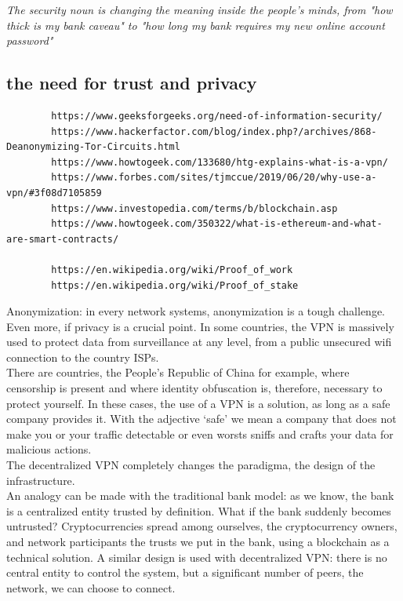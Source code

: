 \documentclass[]{article}
\begin{document}
	\textit{The security noun is changing the meaning inside the people's minds, from "how thick is my bank caveau" to "how long my bank requires my new online account password"}

	\subsection{the need for trust and privacy}

	\begin{verbatim}
		https://www.geeksforgeeks.org/need-of-information-security/
		https://www.hackerfactor.com/blog/index.php?/archives/868-Deanonymizing-Tor-Circuits.html
		https://www.howtogeek.com/133680/htg-explains-what-is-a-vpn/
		https://www.forbes.com/sites/tjmccue/2019/06/20/why-use-a-vpn/#3f08d7105859
		https://www.investopedia.com/terms/b/blockchain.asp
		https://www.howtogeek.com/350322/what-is-ethereum-and-what-are-smart-contracts/
		
		https://en.wikipedia.org/wiki/Proof_of_work
		https://en.wikipedia.org/wiki/Proof_of_stake
	\end{verbatim}

	Anonymization: in every network systems, anonymization is a tough challenge. Even more, if privacy is a crucial point. In some countries, the VPN is massively used to protect data from surveillance at any level, from a public unsecured wifi connection to the country ISPs.\\There are countries, the People's Republic of China for example, where censorship is present and where identity obfuscation is, therefore, necessary to protect yourself. In these cases, the use of a VPN is a solution, as long as a safe company provides it. With the adjective `safe' we mean a company that does not make you or your traffic detectable or even worsts sniffs and crafts your data for malicious actions.\\

	The decentralized VPN completely changes the paradigma, the design of the infrastructure.\\
	An analogy can be made with the traditional bank model: as we know, the bank is a centralized entity trusted by definition. What if the bank suddenly becomes untrusted? Cryptocurrencies spread among ourselves, the cryptocurrency owners, and network participants the trusts we put in the bank, using a blockchain as a technical solution. 
	A similar design is used with decentralized VPN: there is no central entity to control the system, but a significant number of peers, the network, we can choose to connect.
\end{document}
